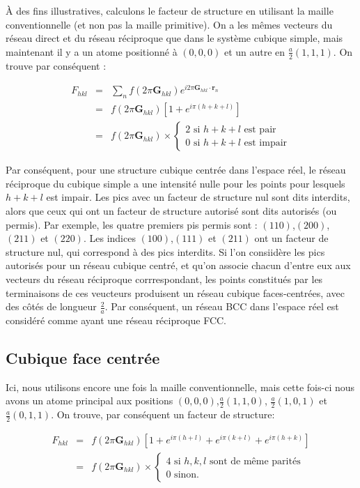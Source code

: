 À des fins illustratives, calculons le facteur de structure en utilisant la
maille conventionnelle (et non pas la maille primitive). On a les mêmes vecteurs
du réseau direct et du réseau réciproque que dans le système cubique simple, mais
maintenant il y a un atome positionné à $(0,0,0)$ et un autre en
$\frac{a}{2}(1,1,1)$. On trouve par conséquent :

\begin{eqnarray}
    F_{hkl} & = & \sum_n f(2\pi\mathbf{G}_{hkl}) e^{i 2\pi \mathbf{G}_{hkl}\cdot\mathbf{r}_n} \\
    & = & f(2\pi \mathbf{G}_{hkl}) [1 + e^{i\pi(h+k+l)}] \\
    & = & f(2\pi \mathbf{G}_{hkl}) \times \begin{cases} 2 \text{ si } h+k+l \text{ est pair}\\ 0 \text{ si } h+k+l \text{ est impair}\end{cases}
\end{eqnarray}

Par conséquent, pour une structure cubique centrée dans l'espace réel, le réseau 
réciproque du cubique simple a une intensité nulle pour les points pour lesquels
$h + k + l$ est impair. Les pics avec un facteur de structure nul sont dits
interdits, alors que ceux qui ont un facteur de structure autorisé sont dits
autorisés (ou permis). Par exemple, les quatre premiers pis permis sont :
$(110)$,$(200)$,$(211)$ et $(220)$. Les indices $(100)$,$(111)$ et $(211)$ ont un
facteur de structure nul, qui correspond à des pics interdits. Si l'on consiidère
les pics autorisés pour un réseau cubique centré, et qu'on associe chacun d'entre
eux aux vecteurs du réseau réciproque corrrespondant, les points constitués par
les terminaisons de ces veucteurs produisent un réseau cubique faces-centrées,
avec des côtés de longueur $\frac{2}{a}$. Par conséquent, un réseau BCC dans
l'espace réel est considéré comme ayant une réseau réciproque FCC. 

\subsection{Cubique face centrée}

Ici, nous utilisons encore une fois la maille conventionnelle, mais cette fois-ci
nous avons un atome principal aux positions $(0,0,0)$,$\frac{a}{2}(1,1,0)$,
$\frac{a}{2}(1,0,1)$ et $\frac{a}{2}(0,1,1)$. On trouve, par conséquent un
facteur de structure:

\begin{eqnarray}
    F_{hkl} & = & f(2\pi \mathbf{G}_{hkl}) [ 1 + e^{i\pi(h+l)} + e^{i\pi(k+l)} + e^{i\pi(h+k)}]\\
    & = & f(2\pi\mathbf{G}_{hkl}) \times \begin{cases} 4 \text{ si } h,k,l \text{ sont de même parités}\\
    0\text{ sinon.} \end{cases}
\end{eqnarray}

